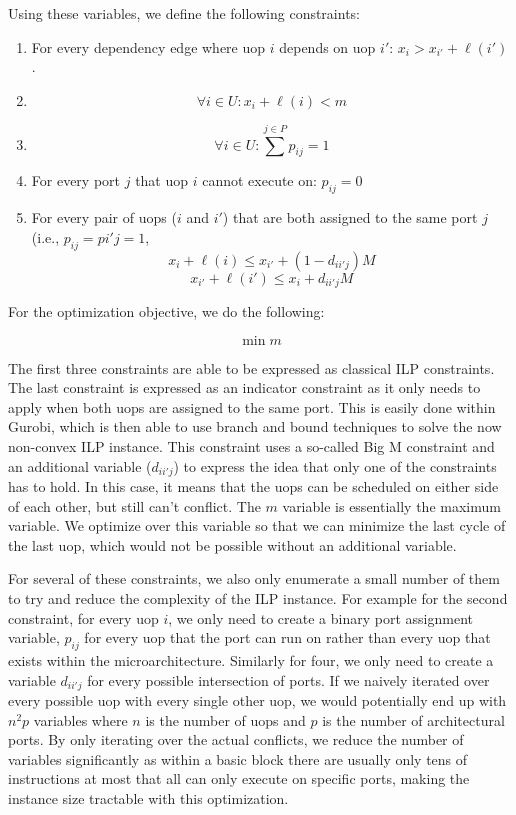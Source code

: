 \documentclass[sigconf]{acmart}
\begin{document}
Using these variables, we define the following constraints:

\begin{enumerate}
    \item For every dependency edge where uop $i$ depends on uop $i'$: $x_i>x_{i'}+\ell(i')$.
    \item $$\forall i \in U : x_i + \ell(i) < m$$
    \item $$\forall i \in U : \sum^{j \in P} p_{ij}=1$$
    \item For every port $j$ that uop $i$ cannot execute on: $p_{ij}=0$
    \item For every pair of uops ($i$ and $i'$) that are both assigned to the same port $j$ (i.e., $p_{ij}=p{i'j}=1$,
    $$x_i+\ell(i)\leq x_{i'}+(1-d_{ii'j})M$$
    $$x_{i'}+\ell(i')\leq x_{i}+d_{ii'j}M$$
\end{enumerate}

For the optimization objective, we do the following:

$$\min{m}$$

The first three constraints are able to be expressed as classical ILP constraints. The last constraint is expressed
as an indicator constraint as it only needs to apply when both uops are assigned to the same port. This is easily done
within Gurobi, which is then able to use branch and bound techniques to solve the now non-convex ILP instance. This constraint
uses a so-called Big M constraint and an additional variable ($d_{ii'j}$) to express the idea that only one of the constraints
has to hold. In this case, it means that the uops can be scheduled on either side of each other, but still can't conflict.
The $m$ variable is essentially the maximum variable. We optimize over this variable so that we can minimize the last cycle
of the last uop, which would not be possible without an additional variable.

For several of these constraints, we also only enumerate a small number of them to try and reduce the complexity of the ILP
instance. For example for the second constraint, for every uop $i$, we only need to create a binary port assignment variable,
$p_{ij}$ for every uop that the port can run on rather than every uop that exists within the microarchitecture. Similarly for
four, we only need to create a variable $d_{ii'j}$ for every possible intersection of ports. If we naively iterated over every
possible uop with every single other uop, we would potentially end up with $n^2p$ variables where $n$ is the number of uops
and $p$ is the number of architectural ports. By only iterating over the actual conflicts, we reduce the number of variables
significantly as within a basic block there are usually only tens of instructions at most that all can only execute on
specific ports, making the instance size tractable with this optimization.
\end{document}
